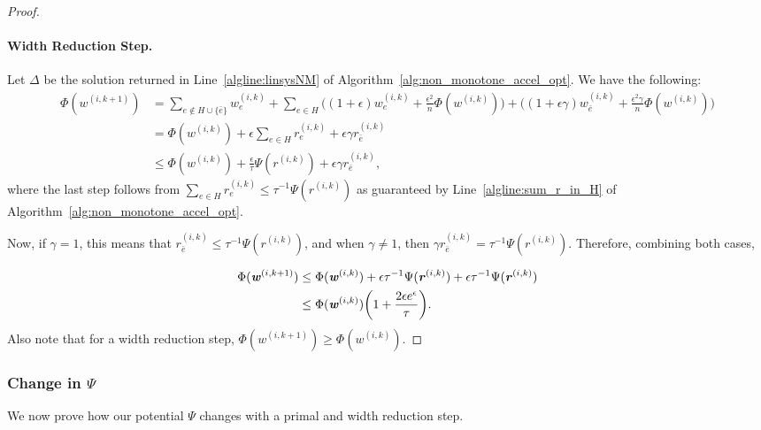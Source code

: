 \documentclass[11pt]{article}
\let\originalleft\left
\let\originalright\right
\renewcommand{\left}{\mathopen{}\mathclose\bgroup\originalleft}
\renewcommand{\right}{\aftergroup\egroup\originalright}
\newcommand\rr{\boldsymbol{\mathit{r}}}
\newcommand\ww{\boldsymbol{\mathit{w}}}
\begin{document}
\begin{proof}
\paragraph*{Width Reduction Step.}
Let $\Delta$ be the solution returned in Line~\ref{algline:linsysNM} of Algorithm~\ref{alg:non_monotone_accel_opt}. 
 We have the following:
\begin{align*}
\Phi(\ww^{(i,k+1)}) & = \sum_{e \notin H\cup \{\bar{e}\}}  \ww_e^{(i,k)} + \sum_{e \in H}  \Big((1+\epsilon) \ww_e^{(i,k)} +\frac{\epsilon^2}{n}\Phi(\ww^{(i,k)})\Big)+  \Big((1+\epsilon\gamma)\ww_{\bar{e}}^{(i,k)} +\frac{\epsilon^2\gamma}{n}\Phi(\ww^{(i,k)})\Big)\\
& = \Phi(\ww^{(i,k)}) + \epsilon \sum_{e \in H}  \rr_e^{(i,k)} + \epsilon \gamma  \rr^{(i,k)}_{\bar{e}}\\
& \leq\Phi(\ww^{(i,k)})  + \frac{\epsilon}{\tau} \Psi(\rr^{(i,k)}) + \epsilon \gamma \rr^{(i,k)}_{\bar{e}},
\end{align*}
where the last step follows from $\sum_{e\in H}\rr^{(i,k)}_e\leq \tau^{-1}\Psi(\rr^{(i,k)})$ as guaranteed by Line~\ref{algline:sum_r_in_H} of Algorithm~\ref{alg:non_monotone_accel_opt}.

Now, if $\gamma = 1$, this means that $\rr^{(i,k)}_{\bar{e}} \leq \tau^{-1}\Psi(\rr^{(i,k)})$, and when $\gamma \neq 1$, then $\gamma\rr^{(i,k)}_{\bar{e}}  = \tau^{-1}\Psi(\rr^{(i,k)})$. Therefore, combining both cases,


\begin{align*}
\Phi(\ww^{(i,k+1)}) & \leq \Phi(\ww^{(i,k)})  + \epsilon \tau^{-1}\Psi(\rr^{(i,k)}) + \epsilon \tau^{-1}\Psi(\rr^{(i,k)})\\
& \leq \Phi(\ww^{(i,k)}) \left(1 + \frac{2\epsilon e^{\epsilon}}{\tau}\right).
\end{align*}
Also note that for a width reduction step, $\Phi(\ww^{(i,k+1)}) \geq \Phi(\ww^{(i,k)})$.
\end{proof}


\subsubsection*{Change in $\Psi$}


We now prove how our potential $\Psi$ changes with a primal and width reduction step.
\end{document}
